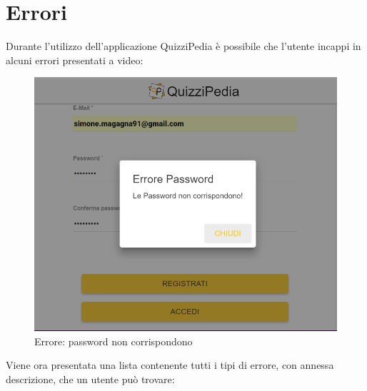 \newpage
\section{Errori}
Durante l'utilizzo dell'applicazione QuizziPedia è possibile che l'utente incappi in alcuni errori presentati a video:

\label{Errore}
\begin{figure}[ht]
	\centering
	\includegraphics[scale=0.45]{img/errore.png}
	\caption{Errore: password non corrispondono}
\end{figure}
\FloatBarrier 

Viene ora presentata una lista contenente tutti i tipi di errore, con annessa descrizione, che un utente può trovare:

